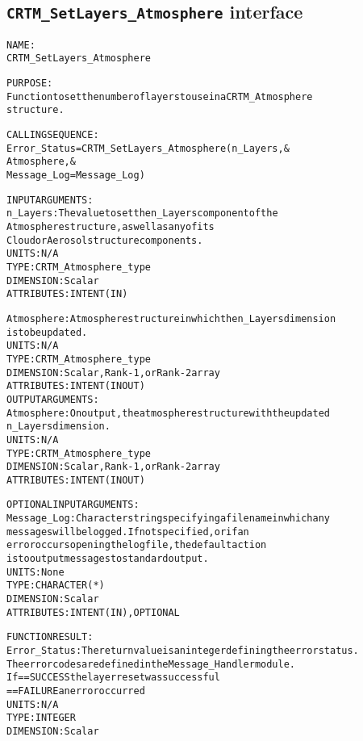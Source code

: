 \subsection{\texttt{CRTM\_SetLayers\_Atmosphere} interface}
  \label{sec:CRTM_SetLayers_Atmosphere_interface}
  \begin{alltt}
 
  NAME:
        CRTM_SetLayers_Atmosphere
  
  PURPOSE:
        Function to set the number of layers to use in a CRTM_Atmosphere
        structure.
 
  CALLING SEQUENCE:
        Error_Status = CRTM_SetLayers_Atmosphere( n_Layers               , &
                                                  Atmosphere             , &
                                                  Message_Log=Message_Log  )
 
  INPUT ARGUMENTS:
        n_Layers:     The value to set the n_Layers component of the 
                      Atmosphere structure, as well as any of its
                      Cloud or Aerosol structure components.
                      UNITS:      N/A
                      TYPE:       CRTM_Atmosphere_type
                      DIMENSION:  Scalar
                      ATTRIBUTES: INTENT(IN)
 
        Atmosphere:   Atmosphere structure in which the n_Layers dimension
                      is to be updated.
                      UNITS:      N/A
                      TYPE:       CRTM_Atmosphere_type
                      DIMENSION:  Scalar, Rank-1, or Rank-2 array
                      ATTRIBUTES: INTENT(IN OUT)
  OUTPUT ARGUMENTS:
        Atmosphere:   On output, the atmosphere structure with the updated
                      n_Layers dimension.
                      UNITS:      N/A
                      TYPE:       CRTM_Atmosphere_type
                      DIMENSION:  Scalar, Rank-1, or Rank-2 array
                      ATTRIBUTES: INTENT(IN OUT)
 
  OPTIONAL INPUT ARGUMENTS:
        Message_Log:  Character string specifying a filename in which any
                      messages will be logged. If not specified, or if an
                      error occurs opening the log file, the default action
                      is to output messages to standard output.
                      UNITS:      None
                      TYPE:       CHARACTER(*)
                      DIMENSION:  Scalar
                      ATTRIBUTES: INTENT(IN), OPTIONAL
 
  FUNCTION RESULT:
        Error_Status: The return value is an integer defining the error status.
                      The error codes are defined in the Message_Handler module.
                      If == SUCCESS the layer reset was successful
                         == FAILURE an error occurred
                      UNITS:      N/A
                      TYPE:       INTEGER
                      DIMENSION:  Scalar
 

\end{alltt}
